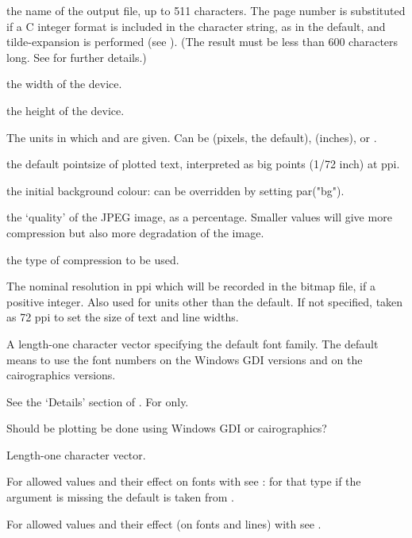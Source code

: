 %
\begin{Arguments}
\begin{ldescription}
\item[\code{filename}] the name of the output file, up to 511 characters.  The
page number is substituted if a C integer format is included in the
character string, as in the default, and tilde-expansion is
performed (see ).   (The result must be less than
600 characters long.  See  for further
details.)

\item[\code{width}] the width of the device.
\item[\code{height}] the height of the device.
\item[\code{units}] The units in which  and  are
given.  Can be  (pixels, the default),  (inches),
 or .
\item[\code{pointsize}] the default pointsize of plotted text, interpreted as
big points (1/72 inch) at  ppi.
\item[\code{bg}] the initial background colour: can be overridden by setting
par("bg").
\item[\code{quality}] the `quality' of the JPEG image, as a
percentage.  Smaller values will give more compression but also more
degradation of the image.
\item[\code{compression}] the type of compression to be used.
\item[\code{res}] The nominal resolution in ppi which will be recorded in the
bitmap file, if a positive integer.  Also used for units other than
the default.  If not specified, taken as 72 ppi to set the size of
text and line widths.
\item[\code{family}] A length-one character vector specifying the default
font family.  The default means to use the font numbers on the
Windows GDI versions and  on the cairographics
versions.
\item[\code{restoreConsole}] See the `Details' section of
.  For  only.
\item[\code{type}] Should be plotting be done using Windows GDI or cairographics?
\item[\code{antialias}] Length-one character vector.

For allowed values and their effect on fonts with  see : for that type if the
argument is missing the default is taken from
.

For allowed values and their effect (on fonts
and lines) with  see .
\end{ldescription}
\end{Arguments}
